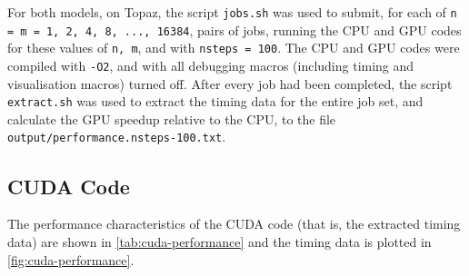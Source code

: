 \documentclass{article}
\newcommand{\lilf}[1]{\lstinline[style=ff]{#1}}
\begin{document}
For both models, on Topaz, the script \lilf{jobs.sh} was used to submit, for
each of \lstinline{n = m = 1, 2, 4, 8, ..., 16384}, pairs of jobs, running the
CPU and GPU codes for these values of \lstinline{n, m}, and with
\lstinline{nsteps = 100}.
The CPU and GPU codes were compiled with \lstinline{-O2}, and with all debugging
macros (including timing and visualisation macros) turned off.
After every job had been completed, the script \lilf{extract.sh} was used to
extract the timing data for the entire job set, and calculate the GPU speedup
relative to the CPU, to the file \lilf{output/performance.nsteps-100.txt}.

\subsection{CUDA Code}
\label{sec:cuda-code}

The performance characteristics of the CUDA code (that is, the extracted timing
data) are shown in \autoref{tab:cuda-performance} and the timing data is plotted
in \autoref{fig:cuda-performance}.

\begin{table}[h]
  \begin{center}
  \end{center}
  \caption[Performance characteristics of CUDA code.]{
    Performance characteristics of CUDA code, compiled with
    \lstinline[language=bash]{-02}, and with debugging statements turned off.
    All times are presented in units of \si{\ms}.
  }
  \label{tab:cuda-performance}
\end{table}
\end{document}

